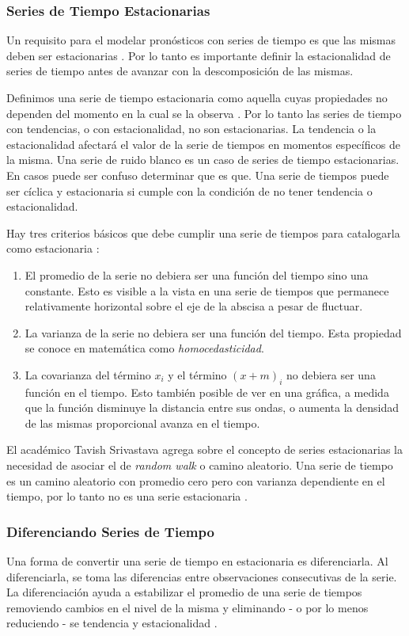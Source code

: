 \subsubsection{Series de Tiempo Estacionarias}
Un requisito para el modelar pronósticos con series de tiempo es que las mismas deben ser estacionarias \cite{srivastava}. Por lo tanto es importante definir la estacionalidad de series de tiempo antes de avanzar con la descomposición de las mismas. 

Definimos una serie de tiempo estacionaria como aquella cuyas propiedades no dependen del momento en la cual se la observa \cite{hyndman}. Por lo tanto las series de tiempo con tendencias, o con estacionalidad, no son estacionarias. La tendencia o la estacionalidad afectará el valor de la serie de tiempos en momentos específicos de la misma. Una serie de ruido blanco es un caso de series de tiempo estacionarias. En casos puede ser confuso determinar que es que. Una serie de tiempos puede ser cíclica y estacionaria si cumple con la condición de no tener tendencia o estacionalidad.

Hay tres criterios básicos que debe cumplir una serie de tiempos para catalogarla como estacionaria \cite{srivastava}:

\begin{enumerate}
	\item El promedio de la serie no debiera ser una función del tiempo sino una constante. Esto es visible a la vista en una serie de tiempos que permanece relativamente horizontal sobre el eje de la abscisa a pesar de fluctuar. 
	\item La varianza de la serie no debiera ser una función del tiempo. Esta propiedad se conoce en matemática como \emph{homocedasticidad}.
    \item La covarianza del término $x_i$ y el término $(x + m)_i$ no debiera ser una función en el tiempo. Esto también posible de ver en una gráfica, a medida que la función disminuye la distancia entre sus ondas, o aumenta la densidad de las mismas proporcional avanza en el tiempo. 
\end{enumerate}

El académico Tavish Srivastava agrega sobre el concepto de series estacionarias la necesidad de asociar el de \emph{random walk} o camino aleatorio. Una serie de tiempo es un camino aleatorio con promedio cero pero con varianza dependiente en el tiempo, por lo tanto no es una serie estacionaria \cite{srivastava}.

\subsubsection{Diferenciando Series de Tiempo}
Una forma de convertir una serie de tiempo en estacionaria es diferenciarla. Al diferenciarla, se toma las diferencias entre observaciones consecutivas de la serie. La diferenciación ayuda a estabilizar el promedio de una serie de tiempos removiendo cambios en el nivel de la misma y eliminando - o por lo menos reduciendo - se tendencia y estacionalidad \cite{hyndman}. 

